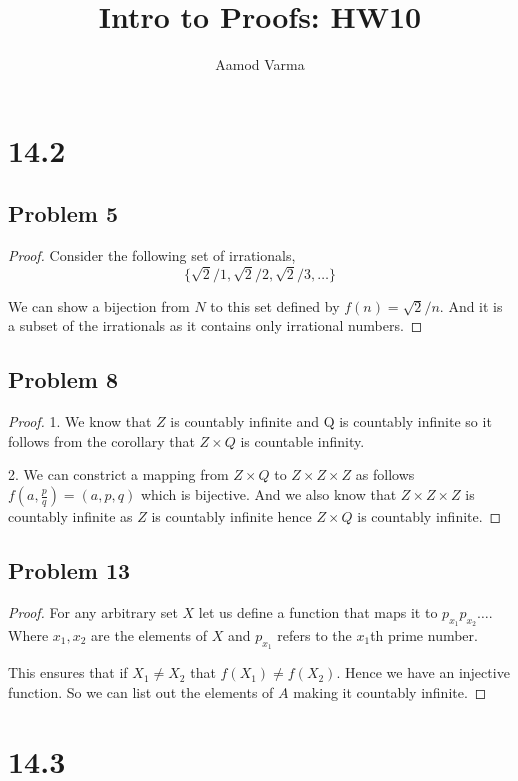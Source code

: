 \documentclass[a4paper]{report}
\title{Intro to Proofs: HW10}
\author{Aamod Varma}
\begin{document}
\maketitle
\date{}
\section*{14.2}
\subsection*{Problem 5}
\begin{proof}
    Consider the following set of irrationals, 
    $$ \{\sqrt{2}/1, \sqrt{2}/2,\sqrt{2}/3, \dots\} $$ 

    We can show a bijection from $N$ to this set defined by $f(n) = \sqrt{2}/n$. And it is a subset of the irrationals as it contains only irrational  numbers.
\end{proof}
\subsection*{Problem 8}
\begin{proof}
    1. We know that $Z$ is countably infinite and Q is countably infinite so it follows from the corollary that $Z \times Q$ is countable infinity.

    2. We can constrict a mapping from $Z \times Q$ to $Z \times  Z \times Z$ as follows $f(a, \frac{p}{q}) = (a, p, q)$ which is bijective. And we also know that $Z \times  Z \times Z$ is countably infinite as $Z$ is countably infinite hence $Z \times Q$ is countably infinite.
\end{proof}
\subsection*{Problem 13}
\begin{proof}
    For any arbitrary set  $X$ let us define a function that maps it to $p_{x_1}p_{x_2}\dots$. Where $x_1,x_2$ are the elements of $X$ and $p_{x_1}$ refers to the $x_1$th prime number.

    This ensures that if $X_1 \ne X_2$ that $f(X_1) \ne f(X_2)$. Hence we have an injective function. So we can list out the elements of $A$ making it countably infinite.
\end{proof}


\section*{14.3}
\end{document}
